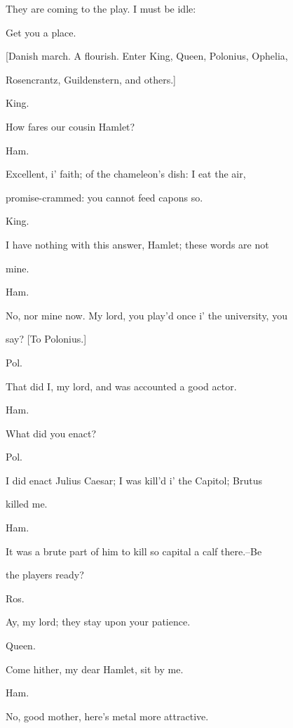 \documentclass[12pt]{book}
\begin{document}
They are coming to the play. I must be idle:

Get you a place.



[Danish march. A flourish. Enter King, Queen, Polonius, Ophelia,

Rosencrantz, Guildenstern, and others.]



King.

How fares our cousin Hamlet?



Ham.

Excellent, i' faith; of the chameleon's dish: I eat the air,

promise-crammed: you cannot feed capons so.



King.

I have nothing with this answer, Hamlet; these words are not

mine.



Ham.

No, nor mine now. My lord, you play'd once i' the university, you

say? [To Polonius.]



Pol.

That did I, my lord, and was accounted a good actor.



Ham.

What did you enact?



Pol.

I did enact Julius Caesar; I was kill'd i' the Capitol; Brutus

killed me.



Ham.

It was a brute part of him to kill so capital a calf there.--Be

the players ready?



Ros.

Ay, my lord; they stay upon your patience.



Queen.

Come hither, my dear Hamlet, sit by me.



Ham.

No, good mother, here's metal more attractive.
\end{document}
